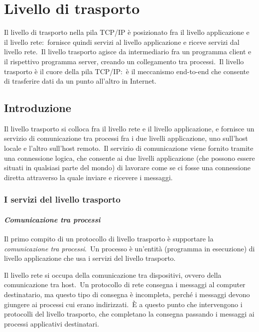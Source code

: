 \chapter{Livello di trasporto}

Il livello di trasporto nella pila TCP/IP è posizionato fra il livello applicazione e il livello rete:\ fornisce quindi servizi al livello applicazione e riceve servizi dal livello rete.\
Il livello trasporto agisce da intermediario fra un programma client e il rispettivo programma server, creando un collegamento tra processi.\
Il livello trasporto è il cuore della pila TCP/IP:\ è il meccanismo end-to-end che consente di trasferire dati da un punto all'altro in Internet.

\section{Introduzione}

Il livello trasporto si colloca fra il livello rete e il livello applicazione, e fornisce un servizio di comunicazione tra processi fra i due livelli applicazione, uno sull'host locale e l'altro sull'host remoto.\
Il servizio di comunicazione viene fornito tramite una connessione logica, che consente ai due livelli applicazione (che possono essere situati in qualsiasi parte del mondo) di lavorare come se ci fosse una connessione diretta attraverso la quale inviare e ricevere i messaggi.

\subsection{I servizi del livello trasporto}

\subsubsection{\emph{Comunicazione tra processi}}

Il primo compito di un protocollo di livello trasporto è supportare la \emph{comunicazione tra processi}.\
Un processo è un'entità (programma in esecuzione) di livello applicazione che usa i servizi del livello trasporto.

Il livello rete si occupa della comunicazione tra dispositivi, ovvero della comunicazione tra host.\
Un protocollo di rete consegna i messaggi al computer destinatario, ma questo tipo di consegna è incompleta, perché i messaggi devono giungere ai processi cui erano indirizzati.\
È a questo punto che intervengono i protocolli del livello trasporto, che completano la consegna passando i messaggi ai processi applicativi destinatari.

